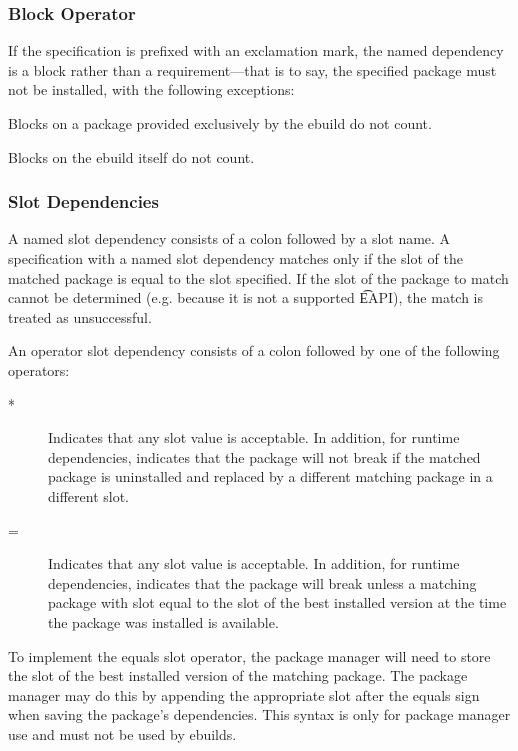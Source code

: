 \subsubsection{Block Operator}

If the specification is prefixed with an exclamation mark, the named dependency is a block rather
than a requirement---that is to say, the specified package must not be installed, with the
following exceptions:

\begin{compactitem}
\item Blocks on a package provided exclusively by the ebuild do not count. \label{provided-blocks}
\item Blocks on the ebuild itself do not count.
\end{compactitem}

\subsubsection{Slot Dependencies}
\label{slot-dep}

A named slot dependency consists of a colon followed by a slot name. A specification with a named
slot dependency matches only if the slot of the matched package is equal to the slot specified. If
the slot of the package to match cannot be determined (e.g. because it is not a supported \t{EAPI}),
the match is treated as unsuccessful.

\IFKDEBUILDELSE
{
    An operator slot dependency consists of a colon followed by one of the following operators:

    \begin{description}
    \item[*] Indicates that any slot value is acceptable. In addition, for runtime dependencies,
    indicates that the package will not break if the matched package is uninstalled and replaced by
    a different matching package in a different slot.
    \item[=] Indicates that any slot value is acceptable. In addition, for runtime dependencies,
    indicates that the package will break unless a matching package with slot equal to the slot of
    the best installed version at the time the package was installed is available.
    \end{description}

    To implement the equals slot operator, the package manager will need to store the slot of the
    best installed version of the matching package. The package manager may do this by appending
    the appropriate slot after the equals sign when saving the package's dependencies. This syntax
    is only for package manager use and must not be used by ebuilds.
}{
}

